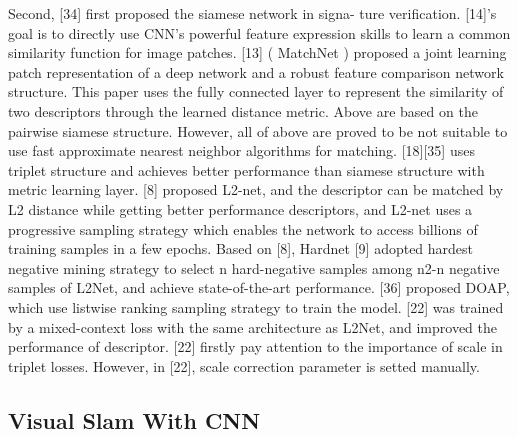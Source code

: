 \documentclass[letterpaper, 10 pt, conference]{ieeeconf}  %
\begin{document}
Second, [34] first proposed the siamese network in signa- ture verification. [14]’s goal is to directly use CNN's powerful feature expression skills to learn a common similarity function for image patches. [13] ( MatchNet ) proposed a joint learning patch representation of a deep network and a robust feature comparison network structure. This paper uses the fully connected layer to represent the similarity of two descriptors through the learned distance metric. Above are based on the pairwise siamese structure. However, all of above are proved to be not suitable to use fast approximate nearest neighbor algorithms for matching. [18][35] uses triplet structure and achieves better performance than siamese structure with metric learning layer. [8] proposed L2-net, and the descriptor can be matched by L2 distance while getting better performance descriptors, and L2-net uses a progressive sampling strategy which enables the network to access billions of training samples in a few epochs. Based on [8], Hardnet [9] adopted hardest negative mining strategy to select n hard-negative samples among n2-n negative samples of L2Net, and achieve state-of-the-art performance. [36] proposed DOAP, which use listwise ranking sampling strategy to train the model. [22] was trained by a mixed-context loss with the same architecture as L2Net, and improved the performance of descriptor. [22] firstly pay attention to the importance of scale in triplet losses. However, in [22], scale correction parameter is setted manually.
\subsection{Visual Slam With CNN}
\end{document}
